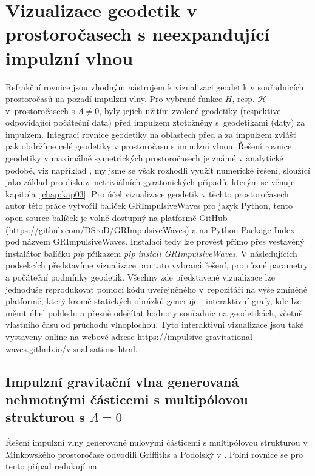 \section{Vizualizace geodetik v prostoročasech s neexpandující impulzní vlnou}
Refrakční rovnice jsou vhodným nástrojem k vizualizaci geodetik v souřadnicích prostoročasů na pozadí impulzní vlny.
Pro vybrané funkce $H$, resp. $\mathcal{H}$ v~prostoročasech s $\Lambda \neq 0$, byly jejich užitím zvolené geodetiky (respektive odpovídající počáteční data) před impulzem ztotožněny
s~geodetikami (daty) za impulzem. Integrací rovnice geodetiky na oblastech před a za impulzem zvlášť pak obdržíme celé geodetiky v prostoročasu s
impulzní vlnou. Řešení rovnice geodetiky v maximálně symetrických prostoročasech je známé v analytické podobě, viz například \cite{Podolsk__2001}, my jsme se však
rozhodli využít numerické řešení, sloužící jako základ pro diskuzi netriviálních gyratonických případů, kterým se věnuje kapitola~\ref{chap:kap03}.
Pro účel vizualizace geodetik v těchto prostoročasech autor této práce vytvořil balíček GRImpulsiveWaves pro jazyk Python,
tento open-source balíček je volně dostupný na platformě GitHub (\url{https://github.com/DSroD/GRImpulsiveWaves}) a na Python Package Index pod názvem
GRImpulsiveWaves. Instalaci tedy lze provést přímo přes vestavěný instalátor balíčku \emph{pip} příkazem \textit{pip install GRImpulsiveWaves}. V následujících podsekcích
představíme vizualizace pro tato vybraná řešení, pro různé parametry a počáteční podmínky geodetik. Všechny zde představené vizualizace lze jednoduše reprodukovat
pomocí kódu uveřejněného v~repozitáři na výše zmíněné platformě, který kromě statických obrázků generuje i interaktivní grafy, kde lze měnit úhel pohledu a přesně odečítat
hodnoty souřadnic na geodetikách, včetně vlastního času od průchodu vlnoplochou. Tyto interaktivní vizualizace jsou také vystaveny online
na webové adrese \url{https://impulsive-gravitational-waves.github.io/visualisations.html}.

\subsection{Impulzní gravitační vlna generovaná nehmotnými částicemi s multipólovou strukturou s \texorpdfstring{$\Lambda=0$}{Lambda=0}}

Řešení impulzní vlny generované nulovými částicemi s multipólovou strukturou v Minkowského prostoročase odvodili
Griffiths a Podolský v \cite{Griffiths_1997}. Polní rovnice se pro tento případ redukují na

